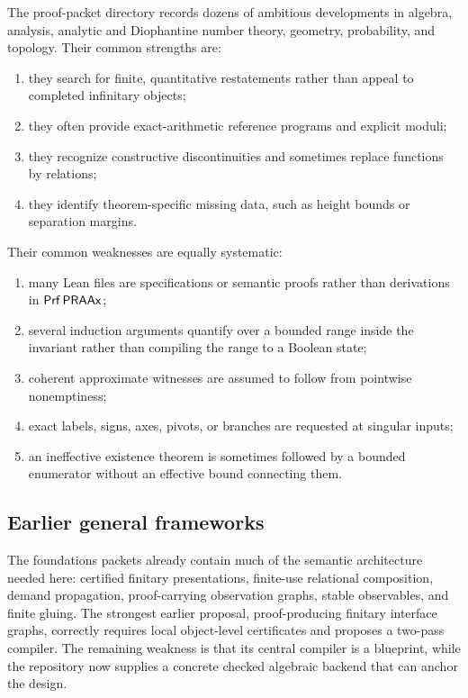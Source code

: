 The proof-packet directory records dozens of ambitious developments in algebra, analysis, analytic and Diophantine number theory, geometry, probability, and topology.  Their common strengths are:
\begin{enumerate}[label=(\arabic*)]
  \item they search for finite, quantitative restatements rather than appeal to completed infinitary objects;
  \item they often provide exact-arithmetic reference programs and explicit moduli;
  \item they recognize constructive discontinuities and sometimes replace functions by relations;
  \item they identify theorem-specific missing data, such as height bounds or separation margins.
\end{enumerate}
Their common weaknesses are equally systematic:
\begin{enumerate}[label=(\arabic*)]
  \item many Lean files are specifications or semantic proofs rather than derivations in \(\mathsf{Prf}\,\mathsf{PRAAx}\);
  \item several induction arguments quantify over a bounded range inside the invariant rather than compiling the range to a Boolean state;
  \item coherent approximate witnesses are assumed to follow from pointwise nonemptiness;
  \item exact labels, signs, axes, pivots, or branches are requested at singular inputs;
  \item an ineffective existence theorem is sometimes followed by a bounded enumerator without an effective bound connecting them.
\end{enumerate}

\subsection{Earlier general frameworks}

The foundations packets already contain much of the semantic architecture needed here: certified finitary presentations, finite-use relational composition, demand propagation, proof-carrying observation graphs, stable observables, and finite gluing.  The strongest earlier proposal, proof-producing finitary interface graphs, correctly requires local object-level certificates and proposes a two-pass compiler.  The remaining weakness is that its central compiler is a blueprint, while the repository now supplies a concrete checked algebraic backend that can anchor the design.

